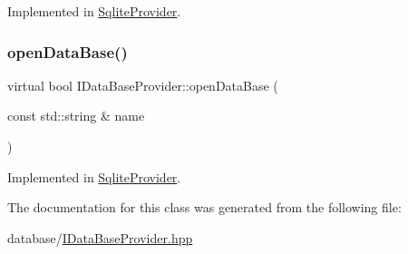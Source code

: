 Implemented in \mbox{\hyperlink{classSqliteProvider_a2654aee827789cfc1d40e9992d441056}{Sqlite\+Provider}}.

\mbox{\label{classIDataBaseProvider_a3b467ba6923af62a82475a2a817eb1c8}} 
\subsubsection{\texorpdfstring{open\+Data\+Base()}{openDataBase()}}
{\footnotesize\ttfamily virtual bool I\+Data\+Base\+Provider\+::open\+Data\+Base (\begin{DoxyParamCaption}\item[{const std\+::string \&}]{name }\end{DoxyParamCaption})\hspace{0.3cm}{\ttfamily [pure virtual]}}



Implemented in \mbox{\hyperlink{classSqliteProvider_ac37c4f4cb4438b309f7b57eda4579b79}{Sqlite\+Provider}}.



The documentation for this class was generated from the following file\+:\begin{DoxyCompactItemize}
\item 
database/\mbox{\hyperlink{IDataBaseProvider_8hpp}{I\+Data\+Base\+Provider.\+hpp}}\end{DoxyCompactItemize}
